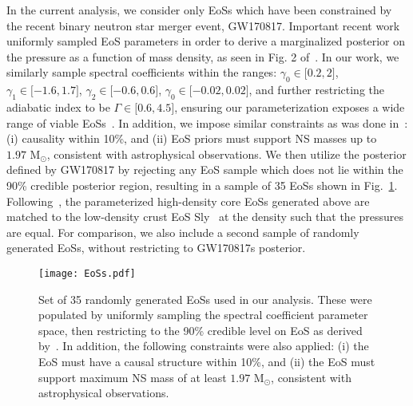 \documentclass[prd,twocolumn,nofootinbib,superscriptaddress,amsmath,amssymb]{revtex4-1}
\begin{document}
In the current analysis, we consider only EoSs which have been constrained by the recent binary neutron star merger event, GW170817.
Important recent work~\cite{LIGO:posterior} uniformly sampled EoS parameters in order to derive a marginalized posterior on the pressure as a function of mass density, as seen in Fig. 2 of~\cite{LIGO:posterior}.
In our work, we similarly sample spectral coefficients within the ranges: $\gamma_0 \in \lbrack 0.2,2 \rbrack$, $\gamma_1 \in \lbrack -1.6,1.7 \rbrack$, $\gamma_2 \in \lbrack -0.6,0.6 \rbrack$, $\gamma_0 \in \lbrack -0.02,0.02 \rbrack$, and further restricting the adiabatic index to be $\Gamma \in \lbrack 0.6,4.5 \rbrack$, ensuring our parameterization exposes a wide range of viable EoSs~\cite{Lindblom:parameters}.
In addition, we impose similar constraints as was done in~\cite{LIGO:posterior}: (i) causality within 10\%, and (ii) EoS priors must support NS masses up to $1.97 \text{ M}_{\odot}$, consistent with astrophysical observations.
We then utilize the posterior defined by GW170817 by rejecting any EoS sample which does not lie within the 90\% credible posterior region, resulting in a sample of 35 EoSs shown in Fig.~\ref{fig:eos}.
Following~\cite{Read2009}, the parameterized high-density core EoSs generated above are matched to the low-density crust EoS Sly~\cite{Douchin:2001sv} at the density such that the pressures are equal.
For comparison, we also include a second sample of randomly generated EoSs, without restricting to GW170817s posterior.
\begin{figure}
\begin{center} 
\texttt{[image: EoSs.pdf]}
\end{center}
\caption{
Set of 35 randomly generated EoSs used in our analysis. 
These were populated by uniformly sampling the spectral coefficient parameter space, then restricting to the 90\% credible level on EoS as derived by~\cite{LIGO:posterior}.
In addition, the following constraints were also applied: (i) the EoS must have a causal structure within 10\%, and (ii) the EoS must support maximum NS mass of at least $1.97 \text{ M}_{\odot}$, consistent with astrophysical observations.
}
\label{fig:eos}
\end{figure} 
\end{document}
